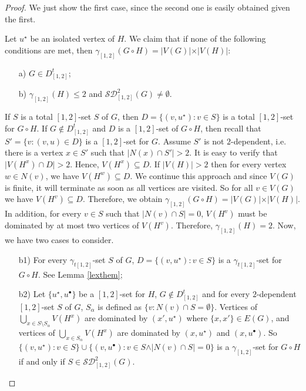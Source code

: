 \documentclass[A4,12pt]{article}
\theoremstyle{definition}
\theoremstyle{remark}
\begin{document}
\begin{proof}
	We just show the first case, since the second one is easily obtained given the first.
	
Let $u^{\star}$ be an isolated vertex of $H$.
We claim that if none of the following conditions are met, then $\gamma_{[1,2]}(G \circ H)=\vert V(G)\vert \times \vert V(H)\vert $:
\begin{enumerate}
	\item[a)]
 $G \in D_{[1,2]}^t$;
 \item[b)]
  $\gamma_{[1,2]}(H)\leq 2$ and $\mathcal{SD}^2_{[1,2]}(G)\neq \emptyset$.
\end{enumerate}


	If $S$ is a total $[1,2]$-set $S$ of $G$, then $D=\{(v,u^{\star}):v\in S\}$ is a total $[1,2]$-set for $G\circ H$.
	If $G \notin D_{[1,2]}^t$ and $D$ is a $[1,2]$-set of $G\circ H$, then recall that $S'=\{v:(v,u)\in D \}$ is a $[1,2]$-set for $G$. Assume $S'$ is not $2$-dependent, i.e. there is a vertex $x\in S'$ such that $\vert N(x)\cap S' \vert >2$. It is easy to verify that $\vert V(H^x)\cap D\vert >2$. Hence, $V(H^x)\subseteq D$. If $\vert V(H) \vert >2$ then for every vertex $w \in N(v)$, we have $V(H^w) \subseteq D$. We continue this approach and since $V(G)$ is finite, it will terminate as soon as all vertices are visited. So for all $v\in V(G)$ we have $V(H^v)\subseteq D$. Therefore, we obtain  $\gamma_{[1,2]}(G \circ H)=\vert V(G)\vert \times \vert V(H)\vert $.
In addition, for every $v \in S$ such that $\vert N(v)\cap S\vert =0$,  $V(H^v)$ must be dominated by at most two vertices of $V(H^v)$. Therefore, $\gamma_{[1,2]}(H)=2$. Now, we have two cases to consider.

\begin{enumerate}
\item [b1)]
	For every $\gamma_{t[1,2]}$-set $S$ of $G$, $D=\{(v,u^{\star}):v\in S\}$ is a $\gamma_{t[1,2]}$-set for $G\circ H$. See Lemma \ref{lexthem};
	\item [b2)]
	Let $\{u^{\star},u^{\bullet}\}$ be a $[1,2]$-set for $H$,  $G \notin D_{[1,2]}^t$ and for every $2$-dependent $[1,2]$-set $S$ of $G$,  $S_{\alpha}$ is defined as $\{v:N(v)\cap S=\emptyset\}$. Vertices of $\bigcup_{x\in S\setminus S_{\alpha}}V(H^x)$ are dominated by $(x',u^{\star})$ where $\{x,x'\}\in E(G)$, and  vertices of $\bigcup_{x\in S_{\alpha}}V(H^x)$ are dominated by $(x,u^{\star})$ and $(x,u^{\bullet})$. So
$\{(v,u^{\star}):v \in S\}\cup\{(v,u^{\bullet}):v \in S\wedge\vert N(v)\cap S\vert  =0\}$  is a $\gamma_{[1,2]}$-set for $G \circ H$ if and only if $S\in \mathcal{SD}^2_{[1,2]}(G)$.
\end{enumerate}
\end{proof}
\end{document}
